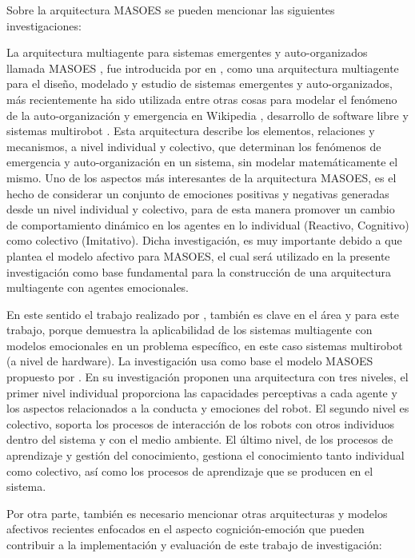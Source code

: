 Sobre la arquitectura MASOES se pueden mencionar las siguientes investigaciones:

La arquitectura multiagente para sistemas emergentes y auto-organizados llamada
MASOES ,
fue introducida por \citeauthor{perozo2011} en \citeyear{perozo2011}, como una arquitectura
multiagente para el diseño, modelado y estudio de sistemas emergentes y
auto-organizados, más recientemente ha sido utilizada entre otras cosas para
modelar el fenómeno de la auto-organización y emergencia en Wikipedia \citep{perozo2013},
desarrollo de software libre \citep{perozo2013} y sistemas
multirobot \citep{gil2015}. Esta arquitectura describe los elementos,
relaciones y mecanismos, a nivel individual y colectivo, que determinan los
fenómenos de emergencia y auto-organización en un sistema, sin modelar
matemáticamente el mismo. Uno de los aspectos más interesantes de la
arquitectura MASOES, es el hecho de considerar un conjunto de emociones
positivas y negativas generadas desde un nivel individual y colectivo, para de
esta manera promover un cambio de comportamiento dinámico en los agentes en lo
individual (Reactivo, Cognitivo) como colectivo (Imitativo). Dicha
investigación, es muy importante debido a que plantea el modelo afectivo para
MASOES, el cual será utilizado en la presente investigación como base
fundamental para la construcción de una arquitectura multiagente con agentes
emocionales.

En este sentido el trabajo realizado por \cite{gil2015}, también es clave en
el área y para este trabajo, porque demuestra la aplicabilidad de los sistemas
multiagente con modelos emocionales en un problema específico, en este caso
sistemas multirobot (a nivel de hardware). La investigación usa como base el
modelo MASOES propuesto por \cite{perozo2011}. En su investigación proponen una
arquitectura con tres niveles, el primer nivel individual proporciona las
capacidades perceptivas a cada agente y los aspectos relacionados a la conducta
y emociones del robot. El segundo nivel es colectivo, soporta los procesos de
interacción de los robots con otros individuos dentro del sistema y con el medio
ambiente. El último nivel, de los procesos de aprendizaje y gestión del
conocimiento, gestiona el conocimiento tanto individual como colectivo, así como
los procesos de aprendizaje que se producen en el sistema.

Por otra parte, también es necesario mencionar otras arquitecturas y modelos
afectivos recientes enfocados en el aspecto cognición-emoción que pueden
contribuir a la implementación y evaluación de este trabajo de investigación:

